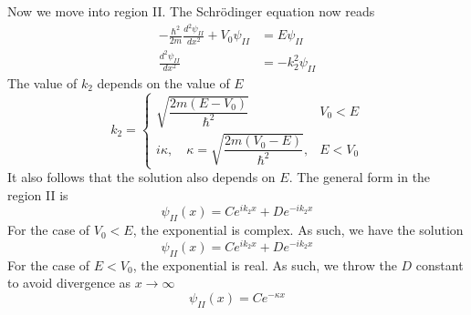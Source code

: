 \documentclass[../../../main.tex]{subfiles}
\begin{document}
Now we move into region II.
The Schrödinger equation now reads
\begin{align*}
  -\frac{\hbar^2}{2m} \frac{d^2 \psi_{II}}{dx^2} + V_0 \psi_{II} & =  E \psi_{II}      \\
  \frac{d^2 \psi_{II}}{dx^2}                                     & = - k_2^2 \psi_{II}
\end{align*}
The value  of $k_2$ depends on the value of $E$
\begin{equation*}
  k_2 =
  \begin{cases}
    \sqrt{\dfrac{2 m (E - V_0)}{\hbar^2}}                           & V_0<E   \\
    i \kappa, \quad \kappa = \sqrt{\dfrac{2 m (V_0 - E)}{\hbar^2}}, & E < V_0
  \end{cases}
\end{equation*}
It also follows that the solution also depends on $E$.
The general form in the region II is
\begin{equation*}
  \psi_{II}(x)=C e^{i k_2 x} + D e^{-i k_2 x}
\end{equation*}
For the case of $V_0<E$, the exponential is complex.
As such, we have the solution
\begin{equation*}
  \psi_{II}(x) = C e^{i k_2 x} + D e^{-i k_2 x}
\end{equation*}
For the case of $E<V_0$, the exponential is real.
As such, we throw the $D$ constant to avoid divergence as $x \rightarrow \infty$
\begin{equation*}
  \psi_{II}(x) =C e^{-\kappa x}
\end{equation*}
\end{document}
